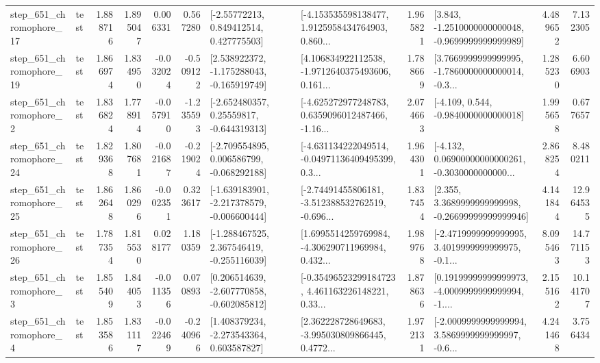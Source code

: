 \begin{tabular}{llrrrrllrlrr}
  step\_651\_chromophore\_17 &      test &      1.888716 &    1.895047 &      0.006331 &  0.567280 &     [-2.55772213, 0.849412514, 0.427775503] &  [-4.153535598138477, 1.9125958434764903, 0.860... &       1.965821 &  [3.843, -1.2510000000000048, -0.9699999999999989] &            4.489652 &          7.132305 \\
  step\_651\_chromophore\_19 &      test &      1.866974 &    1.834950 &     -0.032024 & -0.509122 &   [2.538922372, -1.175288043, -0.165919749] &  [4.106834922112538, -1.9712640375493606, 0.161... &       1.788669 &  [3.7669999999999995, -1.7860000000000014, -0.3... &            1.285230 &          6.606903 \\
   step\_651\_chromophore\_2 &      test &      1.836824 &    1.778914 &     -0.057910 & -1.235593 &    [-2.652480357, 0.25559817, -0.644319313] &  [-4.625272977248783, 0.6359096012487466, -1.16... &       2.074663 &               [-4.109, 0.544, -0.9840000000000018] &            1.995658 &          0.677657 \\
  step\_651\_chromophore\_24 &      test &      1.829368 &    1.807681 &     -0.021687 & -0.219024 &   [-2.709554895, 0.006586799, -0.068292188] &  [-4.631134222049514, -0.04971136409495399, 0.3... &       1.964301 &  [-4.132, 0.06900000000000261, -0.3030000000000... &            2.868254 &          8.480211 \\
  step\_651\_chromophore\_25 &      test &      1.862648 &    1.860296 &     -0.002351 &  0.323617 &  [-1.639183901, -2.217378579, -0.006600444] &  [-2.74491455806181, -3.512388532762519, -0.696... &       1.837454 &  [2.355, 3.3689999999999998, -0.26699999999999946] &            4.141844 &         12.964535 \\
  step\_651\_chromophore\_26 &      test &      1.787354 &    1.815530 &      0.028177 &  1.180359 &   [-1.288467525, 2.367546419, -0.255116039] &  [1.6995514259769984, -4.306290711969984, 0.432... &       1.989768 &  [-2.4719999999999995, 3.4019999999999975, -0.1... &            8.095463 &         14.771153 \\
   step\_651\_chromophore\_3 &      test &      1.855409 &    1.844053 &     -0.011356 &  0.070893 &   [0.206514639, -2.607770858, -0.602085812] &  [-0.35496523299184723, 4.461163226148221, 0.33... &       1.878636 &  [0.19199999999999973, -4.0009999999999994, -1.... &            2.155162 &         10.141707 \\
   step\_651\_chromophore\_4 &      test &      1.853586 &    1.831117 &     -0.022469 & -0.240966 &    [1.408379234, -2.273543364, 0.603587827] &  [2.362228728649683, -3.995030809866445, 0.4772... &       1.972131 &  [-2.0009999999999994, 3.5869999999999997, -0.6... &            4.241468 &          3.756434 \\

\end{tabular}
